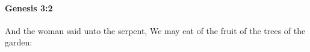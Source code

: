 
		\paragraph{Genesis 3:2} %
			\label{GENESIS-3-2}

			And the woman said unto the serpent, We may eat of the fruit of the trees of the garden:


